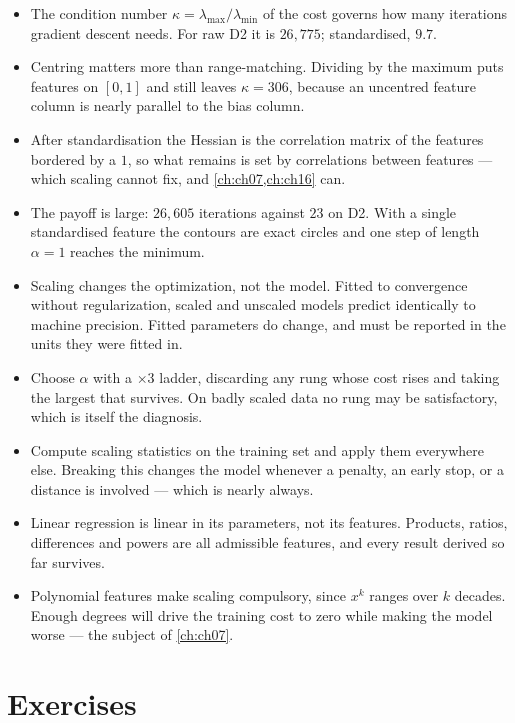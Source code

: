 \begin{itemize}
  \item The condition number $\kappa = \lambda_{\max}/\lambda_{\min}$ of the cost
        governs how many iterations gradient descent needs. For raw D2 it is
        $26{,}775$; standardised, $9.7$.
  \item Centring matters more than range-matching. Dividing by the maximum puts
        features on $[0,1]$ and still leaves $\kappa = 306$, because an uncentred
        feature column is nearly parallel to the bias column.
  \item After standardisation the Hessian is the correlation matrix of the
        features bordered by a $1$, so what remains is set by correlations
        between features --- which scaling cannot fix, and
        \cref{ch:ch07,ch:ch16} can.
  \item The payoff is large: $26{,}605$ iterations against $23$ on D2. With a
        single standardised feature the contours are exact circles and one step
        of length $\alpha = 1$ reaches the minimum.
  \item Scaling changes the optimization, not the model. Fitted to convergence
        without regularization, scaled and unscaled models predict identically to
        machine precision. Fitted parameters do change, and must be reported in
        the units they were fitted in.
  \item Choose $\alpha$ with a $\times 3$ ladder, discarding any rung whose cost
        rises and taking the largest that survives. On badly scaled data no rung
        may be satisfactory, which is itself the diagnosis.
  \item Compute scaling statistics on the training set and apply them everywhere
        else. Breaking this changes the model whenever a penalty, an early stop,
        or a distance is involved --- which is nearly always.
  \item Linear regression is linear in its parameters, not its features. Products,
        ratios, differences and powers are all admissible features, and every
        result derived so far survives.
  \item Polynomial features make scaling compulsory, since $x^k$ ranges over $k$
        decades. Enough degrees will drive the training cost to zero while making
        the model worse --- the subject of \cref{ch:ch07}.
\end{itemize}

\section*{Exercises}

